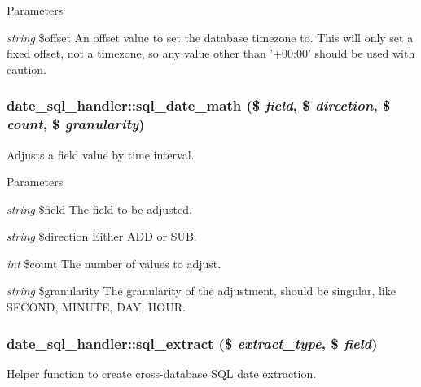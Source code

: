 \begin{DoxyParams}{Parameters}
\item[{\em string}]\$offset An offset value to set the database timezone to. This will only set a fixed offset, not a timezone, so any value other than '+00:00' should be used with caution. \end{DoxyParams}
\hypertarget{classdate__sql__handler_acacf47cb3362f3455a7e872b51ccf660}{
\subsubsection[{sql\_\-date\_\-math}]{\setlength{\rightskip}{0pt plus 5cm}date\_\-sql\_\-handler::sql\_\-date\_\-math (\$ {\em field}, \/  \$ {\em direction}, \/  \$ {\em count}, \/  \$ {\em granularity})}}
\label{classdate__sql__handler_acacf47cb3362f3455a7e872b51ccf660}
Adjusts a field value by time interval.


\begin{DoxyParams}{Parameters}
\item[{\em string}]\$field The field to be adjusted. \item[{\em string}]\$direction Either ADD or SUB. \item[{\em int}]\$count The number of values to adjust. \item[{\em string}]\$granularity The granularity of the adjustment, should be singular, like SECOND, MINUTE, DAY, HOUR. \end{DoxyParams}
\hypertarget{classdate__sql__handler_a1a4028680e7d617328581eb7b5b779a9}{
\subsubsection[{sql\_\-extract}]{\setlength{\rightskip}{0pt plus 5cm}date\_\-sql\_\-handler::sql\_\-extract (\$ {\em extract\_\-type}, \/  \$ {\em field})}}
\label{classdate__sql__handler_a1a4028680e7d617328581eb7b5b779a9}
Helper function to create cross-\/database SQL date extraction.


